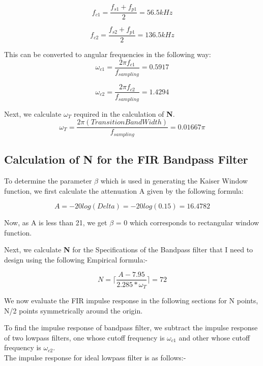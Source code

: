 \documentclass{article}
\begin{document}
\begin{equation}
    f_{c1} = \frac{f_{s1} + f_{p1}}{2} = 56.5 kHz
\end{equation}

\begin{equation}
    f_{c2} = \frac{f_{s2} + f_{p1}}{2} = 136.5 kHz
\end{equation}

This can be converted to angular frequencies in the following way:
\begin{equation}
    \omega_{c1} = \frac{2\pi f_{c1}}{f_{sampling}} = 0.5917
\end{equation}

\begin{equation}
    \omega_{c2} = \frac{2\pi f_{c2}}{f_{sampling}} = 1.4294
\end{equation}


Next, we calculate $\omega_{T}$ required in the calculation of \textbf{N}.
\begin{equation}
    \omega_{T} = \frac{2\pi(Transition Band Width)}{f_{sampling}} = 0.01667\pi
\end{equation}


\subsection{Calculation of N for the FIR Bandpass Filter}

To determine the parameter $\beta$ which is used in generating the Kaiser Window function, we first calculate the attenuation A given by the following formula:

\begin{equation}
    A = -20log(Delta) = -20log(0.15) = 16.4782
\end{equation}

Now, as A is less than 21, we get $\beta$ = 0 which corresponds to rectangular window function.

Next, we calculate \textbf{N} for the Specifications of the Bandpass filter that I need to design using the following Empirical formula:- 

\[N = \lceil \frac{A - 7.95}{2.285*\omega_{T}} \rceil = 72\]

We now evaluate the FIR impulse response in the following sections for N points, N/2 points symmetrically around the origin.

To find the impulse response of bandpass filter, we subtract the impulse response of two lowpass filters, one whose cutoff frequency is $\omega_{c1}$ and other whose cutoff frequency is $\omega_{c2}$. \\
The impulse response for ideal lowpass filter is as follows:-
\end{document}
